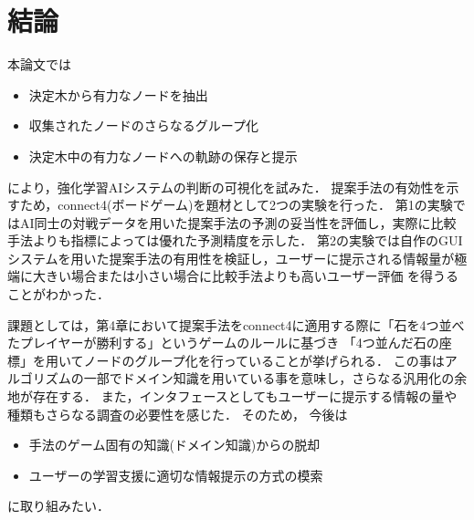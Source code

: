 \chapter{結論}

本論文では
\begin{itemize}
	\item 決定木から有力なノードを抽出
	\item 収集されたノードのさらなるグループ化
	\item 決定木中の有力なノードへの軌跡の保存と提示
\end{itemize}

により，強化学習AIシステムの判断の可視化を試みた．
提案手法の有効性を示すため，connect4(ボードゲーム)を題材として2つの実験を行った．
第1の実験ではAI同士の対戦データを用いた提案手法の予測の妥当性を評価し，実際に比較手法よりも指標によっては優れた予測精度を示した．
第2の実験では自作のGUIシステムを用いた提案手法の有用性を検証し，ユーザーに提示される情報量が極端に大きい場合または小さい場合に比較手法よりも高いユーザー評価
を得うることがわかった．

課題としては，第4章において提案手法をconnect4に適用する際に「石を4つ並べたプレイヤーが勝利する」というゲームのルールに基づき
「4つ並んだ石の座標」を用いてノードのグループ化を行っていることが挙げられる．
この事はアルゴリズムの一部でドメイン知識を用いている事を意味し，さらなる汎用化の余地が存在する．
また，インタフェースとしてもユーザーに提示する情報の量や種類もさらなる調査の必要性を感じた．
そのため，
今後は
\begin{itemize}
	\item 手法のゲーム固有の知識(ドメイン知識)からの脱却
	\item ユーザーの学習支援に適切な情報提示の方式の模索
\end{itemize}


に取り組みたい．
